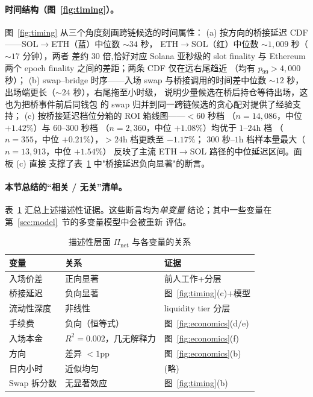 \documentclass[sigconf,nonacm,10pt]{acmart}
\newcommand{\Pnet}{\Pi_{\text{net}}}
\begin{document}
\paragraph{时间结构（图~\ref{fig:timing}）。} 图~\ref{fig:timing}
从三个角度刻画跨链候选的时间属性：
(a) 按方向的桥接延迟 CDF——SOL$\to$ETH（蓝）中位数 $\sim\!34$ 秒，
ETH$\to$SOL（红）中位数 $\sim\!1{,}009$ 秒（$\sim\!17$ 分钟），两者
差约 $30$ 倍,恰好对应 Solana 亚秒级的 slot finality 与 Ethereum
两个 epoch finality 之间的差距；两条 CDF 仅在远右尾趋近
（均有 $p_{99}\!>\!4{,}000$ 秒）；
(b) swap--bridge 时序——入场 swap 与桥接调用的时间差中位数
$\sim\!12$ 秒，出场端更长（$\sim\!24$ 秒），右尾拖至小时级，
说明少量候选在桥后持仓等待出场，这也为把桥事件前后同钱包
的 swap 归并到同一跨链候选的贪心配对提供了经验支持；
(c) 按桥接延迟档位分箱的 ROI 箱线图——$<\!60$ 秒档
（$n=14{,}086$，中位 $+1.42\%$）与 $60$--$300$ 秒档
（$n=2{,}360$，中位 $+1.08\%$）均优于 $1$--$24$h 档
（$n=355$，中位 $+0.21\%$），$>\!24$h 档更跌至 $-1.17\%$；
$300$ 秒--$1$h 档样本量最大（$n=13{,}913$，中位 $+1.54\%$）
反映了主流 ETH$\to$SOL 路径的中位延迟区间。面板 (c) 直接
支撑了表~\ref{tab:univar} 中"桥接延迟负向显著"的断言。

\paragraph{本节总结的“相关 / 无关”清单。}
表~\ref{tab:univar} 汇总上述描述性证据。这些断言均为\emph{单变量}
结论；其中一些变量在第~\ref{sec:model}~节的多变量模型中会被重新
评估。

\begin{table}[h]
  \centering
  \small
  \caption{描述性层面 $\Pnet$ 与各变量的关系}
  \label{tab:univar}
  \begin{tabular}{lll}
    \toprule
    \textbf{变量} & \textbf{关系} & \textbf{证据} \\
    \midrule
    入场价差 & 正向显著 & 前人工作+分层 \\
    桥接延迟 & 负向显著 & 图~\ref{fig:timing}(c)+模型 \\
    流动性深度 & 非线性 & liquidity tier 分层 \\
    手续费  & 负向（恒等式） & 图~\ref{fig:economics}(d/e) \\
    入场本金 & $R^2=0.002$，几无解释力 & 图~\ref{fig:economics}(f) \\
    方向 & 差异 $<\!1$pp & 图~\ref{fig:economics}(b) \\
    日内小时 & 近似均匀 & (略) \\
    Swap 拆分数 & 无显著效应 & 图~\ref{fig:timing}(b) \\
    \bottomrule
  \end{tabular}
\end{table}
\end{document}
